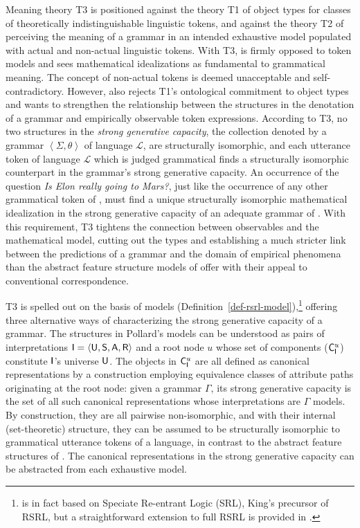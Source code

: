 \documentclass[output=paper,biblatex,babelshorthands,newtxmath,draftmode,colorlinks,citecolor=brown]{langscibook}
\begin{document}
{Meaning theory T3 is positioned against the theory T1 of object types
for classes of theoretically indistinguishable linguistic tokens, and
against the theory T2 of perceiving the meaning of a grammar in an
intended exhaustive model populated with actual and non-actual
linguistic tokens.  With T3, \citet{Pollard99a} is firmly opposed to
token models and sees mathematical idealizations as fundamental to
grammatical meaning.  The concept of non-actual tokens is deemed
unacceptable and self-contradictory. However, \citet{Pollard99a} also
rejects T1's ontological commitment to object types and wants to
strengthen the relationship between the structures in the denotation
of a grammar and empirically observable token expressions.  According
to T3, no two structures in the \emph{strong generative capacity}, the
collection denoted by a grammar $\left< \Sigma, \theta\right>$ of
language $\mathcal{L}$, are
structurally isomorphic, and each utterance token of language
$\mathcal{L}$ which is judged grammatical finds a structurally
isomorphic counterpart in the grammar's strong generative capacity.
An occurrence of the question \emph{Is Elon really going to Mars?}, just
like the occurrence of any other grammatical token of , must
find a unique structurally isomorphic mathematical idealization in the
strong generative capacity of an
adequate grammar of . With this requirement, T3 tightens the
connection between observables and the mathematical model, cutting out
the types and establishing a much stricter link between the
predictions of a grammar and the domain of empirical phenomena than
the abstract feature structure models of  offer
with their appeal to conventional correspondence.

\largerpage
T3 is spelled out on the basis of models
(Definition~\ref{def-rsrl-model}),\footnote{ is in
  fact based on Speciate Re-entrant Logic (SRL), King's precursor of
  RSRL, but a straightforward extension to full RSRL is provided in
  .} offering three alternative ways of
characterizing the strong generative capacity of a grammar. The
structures in Pollard's models can be understood as pairs of
interpretations $\mathsf{I}=\langle\mathsf{U},\mathsf{S},\mathsf{A},\mathsf{R}\rangle$ and a root node $u$ whose set
of components ($\mathsf{C}_{\mathsf{I}}^u$) constitute $\mathsf{I}$'s universe
$\mathsf{U}$. The objects in $\mathsf{C}_{\mathsf{I}}^u$ are all defined as
canonical representations by a construction employing equivalence
classes of attribute paths originating at the root node: given a
grammar $\Gamma$, its strong generative capacity is the set of all
such canonical representations whose interpretations are $\Gamma$
models. By construction, they are all pairwise non-isomorphic, and
with their internal (set-theoretic) structure, they can be assumed to
be structurally isomorphic to grammatical utterance tokens of a
language, in contrast to the abstract feature structures of
. The canonical representations in the strong
generative capacity can be abstracted from each exhaustive model.



}
\end{document}
